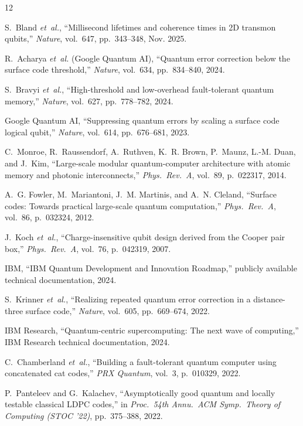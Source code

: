 \documentclass[conference]{IEEEtran}
\begin{document}

\begin{thebibliography}{12}

S.~Bland \emph{et~al.}, ``Millisecond lifetimes and coherence times in 2D transmon qubits,'' \emph{Nature}, vol.~647, pp.~343--348, Nov. 2025.

R.~Acharya \emph{et~al.} (Google Quantum AI), ``Quantum error correction below the surface code threshold,'' \emph{Nature}, vol.~634, pp.~834--840, 2024.

S.~Bravyi \emph{et~al.}, ``High-threshold and low-overhead fault-tolerant quantum memory,'' \emph{Nature}, vol.~627, pp.~778--782, 2024.

Google Quantum AI, ``Suppressing quantum errors by scaling a surface code logical qubit,'' \emph{Nature}, vol.~614, pp.~676--681, 2023.

C.~Monroe, R.~Raussendorf, A.~Ruthven, K.~R. Brown, P.~Maunz, L.-M. Duan, and J.~Kim, ``Large-scale modular quantum-computer architecture with atomic memory and photonic interconnects,'' \emph{Phys.\ Rev.\ A}, vol.~89, p.~022317, 2014.

A.~G. Fowler, M.~Mariantoni, J.~M. Martinis, and A.~N. Cleland, ``Surface codes: Towards practical large-scale quantum computation,'' \emph{Phys.\ Rev.\ A}, vol.~86, p.~032324, 2012.

J.~Koch \emph{et~al.}, ``Charge-insensitive qubit design derived from the Cooper pair box,'' \emph{Phys.\ Rev.\ A}, vol.~76, p.~042319, 2007.

IBM, ``IBM Quantum Development and Innovation Roadmap,'' publicly available technical documentation, 2024.

S.~Krinner \emph{et~al.}, ``Realizing repeated quantum error correction in a distance-three surface code,'' \emph{Nature}, vol.~605, pp.~669--674, 2022.

IBM Research, ``Quantum-centric supercomputing: The next wave of computing,'' IBM Research technical documentation, 2024.

C.~Chamberland \emph{et~al.}, ``Building a fault-tolerant quantum computer using concatenated cat codes,'' \emph{PRX Quantum}, vol.~3, p.~010329, 2022.

P.~Panteleev and G.~Kalachev, ``Asymptotically good quantum and locally testable classical LDPC codes,'' in \emph{Proc.\ 54th Annu.\ ACM Symp.\ Theory of Computing (STOC '22)}, pp.~375--388, 2022.

\end{thebibliography}
\end{document}

